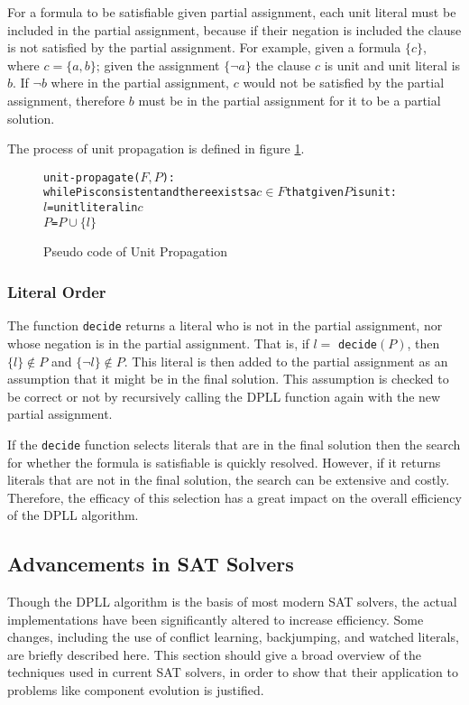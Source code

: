 For a formula to be satisfiable given partial assignment, each unit literal must be included in the partial assignment,
because if their negation is included the clause is not satisfied by the partial assignment.
For example, given a formula $\{c\}$, where $c = \{a,b\}$;
given the assignment $\{\neg a\}$ the clause $c$ is unit and unit literal is $b$.
If $\neg b$ where in the partial assignment, $c$ would not be satisfied by the partial assignment,
therefore $b$ must be in the partial assignment for it to be a partial solution.

The process of unit propagation is defined in figure \ref{impl.propagation}.
\begin{figure}[htp]
\begin{center}
\begin{alltt}
unit-propagate(\(F, P\)):
  while P is consistent and there exists a \(c \in F\) that given \(P\) is unit:
    \(l\) = unit literal in \(c\)
    \(P\) = \(P \cup \{l\}\)
\end{alltt}
  \caption{Pseudo code of Unit Propagation}
  \label{impl.propagation}
\end{center}
\end{figure}

\subsubsection{Literal Order}
The function \verb+decide+ returns a literal who is not in the partial assignment, nor whose negation is in the partial assignment.
That is, if $l =$ \verb+decide+$(P)$, then $\{l\} \not \in P$ and $\{\neg l\} \not \in P$.
This literal is then added to the partial assignment as an assumption that it might be in the final solution.
This assumption is checked to be correct or not by recursively calling the DPLL function again with the new partial assignment.

If the \verb+decide+ function selects literals that are in the final solution then the search for whether the formula is satisfiable is quickly resolved.
However, if it returns literals that are not in the final solution, the search can be extensive and costly.
Therefore, the efficacy of this selection has a great impact on the overall efficiency of the DPLL algorithm.

\subsection{Advancements in SAT Solvers}
Though the DPLL algorithm is the basis of most modern SAT solvers, the actual implementations have been significantly altered to increase efficiency.
Some changes, including the use of conflict learning, backjumping, and watched literals, are briefly described here.
This section should give a broad overview of the techniques used in current SAT solvers, 
in order to show that their application to problems like component evolution is justified. 

